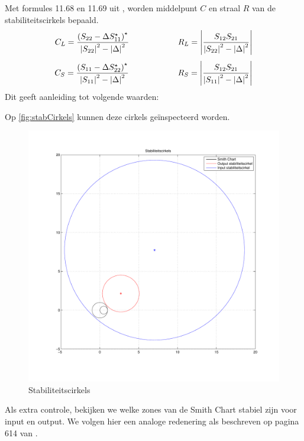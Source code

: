     Met formules 11.68 en 11.69 uit \cite{Pozar}, worden middelpunt $C$ en
    straal $R$ van de stabiliteitscirkels bepaald.
    \[
      C_L = \frac{\left(S_{22} - \Delta S_{11}^{\star}\right)^{\star}}{\left| S_{22} \right|^2 - \left|\Delta\right|^2}
      \qquad \qquad \qquad
      R_L = \left| \frac{S_{12}S_{21}}{\left| S_{22} \right|^2 - \left|\Delta\right|^2}\right|
    \]
    \[
      C_S = \frac{\left(S_{11} - \Delta S_{22}^{\star}\right)^{\star}}{\left| S_{11} \right|^2 - \left|\Delta\right|^2}
      \qquad \qquad \qquad
      R_S = \left| \frac{S_{12}S_{21}}{\left| S_{11} \right|^2 - \left|\Delta\right|^2}\right|
    \]
    Dit geeft aanleiding tot volgende waarden:
    
    
    Op \autoref{fig:stabCirkels} kunnen deze cirkels ge\"inspecteerd worden.
    \begin{figure}[!h]
      \centering
      \includegraphics[width=\textwidth,keepaspectratio=true]{fig/stabiliteitscirkels.pdf}  
      \caption{Stabiliteitscirkels} 
      \label{fig:stabCirkels}
    \end{figure}
    Als extra controle, bekijken we welke zones van de Smith Chart stabiel zijn voor input en output. We volgen hier
    een analoge redenering als beschreven op pagina 614 van \cite{Pozar}.
    
